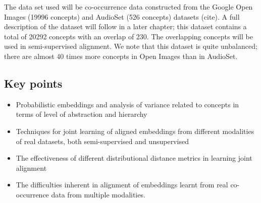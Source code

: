 The data set used will be co-occurrence data constructed from the Google Open Images (19996 concepts) and AudioSet (526 concepts) datasets (cite). A full description of the dataset will follow in a later chapter; this dataset contains a total of 20292 concepts with an overlap of 230. The overlapping concepts will be used in semi-supervised alignment. We note that this dataset is quite unbalanced; there are almost 40 times more concepts in Open Images than in AudioSet. 

\subsection{Key points}
\begin{itemize}
    \item Probabilistic embeddings and analysis of variance related to concepts in terms of level of abstraction and hierarchy
    \item Techniques for joint learning of aligned embeddings from different modalities of real datasets, both semi-supervised and unsupervised
    \item The effectiveness of different distributional distance metrics in learning joint alignment 
    \item The difficulties inherent in alignment of embeddings learnt from real co-occurrence data from multiple modalities. 
\end{itemize}